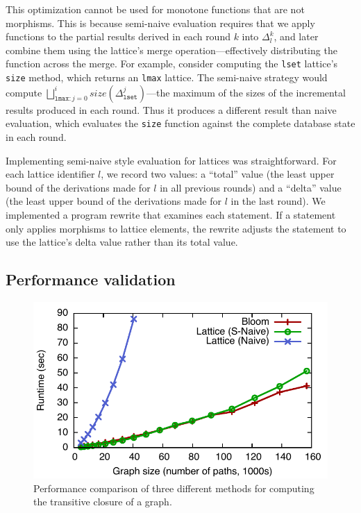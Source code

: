 This optimization cannot be used for monotone functions that are not
morphisms. This is because semi-naive evaluation requires that we apply
functions to the partial results derived in each round $k$ into $\Delta_l^k$,
and later combine them using the lattice's merge operation---effectively
distributing the function across the merge.  For example, consider computing the
\texttt{lset} lattice's \texttt{size} method, which returns an \texttt{lmax}
lattice. The semi-naive strategy would compute
$\bigsqcup_{\mathtt{lmax}:j=0}^i size(\Delta^j_{\mathtt{lset}})$---the maximum of
the sizes of the incremental results produced in each round.  Thus it produces a
different result than naive evaluation, which evaluates the \texttt{size}
function against the complete database state in each round.

Implementing semi-naive style evaluation for lattices was straightforward. For
each lattice identifier $l$, we record two values: a ``total'' value (the least
upper bound of the derivations made for $l$ in all previous rounds) and a
``delta'' value (the least upper bound of the derivations made for $l$ in the
last round). We implemented a program rewrite that examines each \lang
statement. If a statement only applies morphisms to lattice elements, the
rewrite adjusts the statement to use the lattice's delta value rather than its
total value.


\subsection{Performance validation}
\label{sec:lattice-perf}

\begin{figure}[t]
\includegraphics[width=\linewidth]{fig/sn_perf}
\caption{Performance comparison of three different methods for computing the
  transitive closure of a graph.}
\label{fig:tc-perf-graph}
\end{figure}

